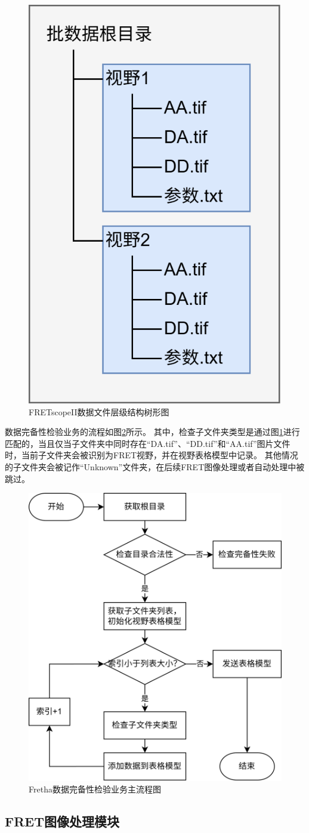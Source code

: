 \begin{figure}[htbp]
    \centering
    \includegraphics[height=0.5\linewidth]{../figures/2/2_FRETscopeII数据格式.drawio.png}
    \caption{FRETscopeII数据文件层级结构树形图}
    \label{fig:fretscope_data_struct}
\end{figure}

数据完备性检验业务的流程如图\ref{fig:fretha_data_check_flow}所示。
其中，检查子文件夹类型是通过图\ref{fig:fretscope_data_struct}进行匹配的，当且仅当子文件夹中同时存在“DA.tif”、“DD.tif”和“AA.tif”图片文件时，当前子文件夹会被识别为FRET视野，并在视野表格模型中记录。
其他情况的子文件夹会被记作“Unknown”文件夹，在后续FRET图像处理或者自动处理中被跳过。

\begin{figure}[htbp]
    \centering
    \includegraphics[width=0.6\linewidth]{../figures/2/2_数据完备性检验业务.drawio.png}
    \caption{Fretha数据完备性检验业务主流程图}
    \label{fig:fretha_data_check_flow}
\end{figure}

\subsection{FRET图像处理模块}

